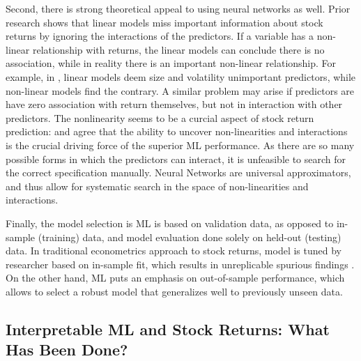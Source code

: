			Second, there is strong theoretical appeal to using neural networks as well. Prior research shows that linear models miss important information about stock returns by ignoring the interactions of the predictors. If a variable has a non-linear relationship with returns, the linear models can conclude there is no association, while in reality there is an important non-linear relationship. For example, in \cite{gu2020empirical}, linear models deem size and volatility unimportant predictors, while non-linear models find the contrary. A similar problem may arise if predictors are have zero association with return themselves, but not in interaction with other predictors. The nonlinearity seems to be a curcial aspect of stock return prediction: \cite{bryzgalova2019forest} and \cite{gu2020empirical} agree that the ability to uncover non-linearities and interactions is the crucial driving force of the superior ML performance.  As there are so many possible forms in which the predictors can interact, it is unfeasible to search for the correct specification manually. Neural Networks are universal approximators, and thus allow for systematic search in the space of non-linearities and interactions.  	
			
			Finally, the model selection is ML is based on validation data, as opposed to in-sample (training) data, and model evaluation done solely on held-out (testing) data. In traditional econometrics approach to stock returns, model is tuned by researcher based on in-sample fit, which results in unreplicable spurious findings \citep{mclean2016does}. On the other hand, ML puts an emphasis on out-of-sample performance, which allows to select a robust model that generalizes well to previously unseen data.  	
			
	
		\subsection{Interpretable ML and Stock Returns: What Has Been Done?}
		
